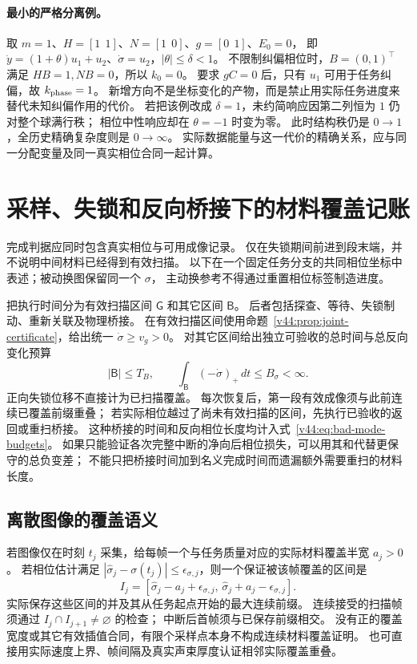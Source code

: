 \documentclass[11pt,a4paper]{article}
\numberwithin{equation}{section}
\theoremstyle{definition}
\begin{document}
\paragraph{最小的严格分离例。}
取 $m=1$、$H=[1\ \ 1]$、$N=[1\ \ 0]$、$g=[0\ \ 1]$、$E_0=0$，
即 $\dot y=(1+\theta)u_1+u_2$、$\dot\sigma=u_2$，$|\theta|\le\delta<1$。
不限制纠偏相位时，$B=(0,1)^\top$ 满足 $HB=1,NB=0$，所以 $k_0=0$。
要求 $gC=0$ 后，只有 $u_1$ 可用于任务纠偏，故 $k_{\rm phase}=1$。
新增方向不是坐标变化的产物，而是禁止用实际任务进度来替代未知纠偏作用的代价。
若把该例改成 $\delta=1$，未约简响应因第二列恒为 $1$ 仍对整个球满行秩；
相位中性响应却在 $\theta=-1$ 时变为零。
此时结构秩仍是 $0\to1$，全历史精确复杂度则是 $0\to\infty$。
实际数据能量与这一代价的精确关系，应与同一分配变量及同一真实相位合同一起计算。

\section{采样、失锁和反向桥接下的材料覆盖记账}
\label{v44:sec:hybrid-coverage}

完成判据应同时包含真实相位与可用成像记录。
仅在失锁期间前进到段末端，并不说明中间材料已经得到有效扫描。
以下在一个固定任务分支的共同相位坐标中表述；被动换图保留同一个 $\sigma$，
主动换参考不得通过重置相位标签制造进度。

把执行时间分为有效扫描区间 $\mathsf G$ 和其它区间 $\mathsf B$。
后者包括探查、等待、失锁制动、重新关联及物理桥接。
在有效扫描区间使用命题~\ref{v44:prop:joint-certificate}，给出统一
$\dot\sigma\ge v_g>0$。
对其它区间给出独立可验收的总时间与总反向变化预算
\begin{equation}
 |\mathsf B|\le T_B,\qquad
 \int_{\mathsf B}(-\dot\sigma)_+\,dt\le B_\sigma<\infty.
 \label{v44:eq:bad-mode-budgets}
\end{equation}
正向失锁位移不直接计为已扫描覆盖。
每次恢复后，第一段有效成像须与此前连续已覆盖前缀重叠；
若实际相位越过了尚未有效扫描的区间，先执行已验收的返回或重扫桥接。
这种桥接的时间和反向相位长度均计入式~\eqref{v44:eq:bad-mode-budgets}。
如果只能验证各次完整中断的净向后相位损失，可以用其和代替更保守的总负变差；
不能只把桥接时间加到名义完成时间而遗漏额外需要重扫的材料长度。

\subsection{离散图像的覆盖语义}
若图像仅在时刻 $t_j$ 采集，给每帧一个与任务质量对应的实际材料覆盖半宽 $a_j>0$。
若相位估计满足 $|\widehat\sigma_j-\sigma(t_j)|\le\epsilon_{\sigma,j}$，则一个保证被该帧覆盖的区间是
\begin{equation}
 I_j=[\widehat\sigma_j-a_j+\epsilon_{\sigma,j},\,
       \widehat\sigma_j+a_j-\epsilon_{\sigma,j}].
 \label{v44:eq:certified-frame-interval}
\end{equation}
实际保存这些区间的并及其从任务起点开始的最大连续前缀。
连续接受的扫描帧须通过 $I_j\cap I_{j+1}\ne\varnothing$ 的检查；
中断后首帧须与已保存前缀相交。
没有正的覆盖宽度或其它有效插值合同，有限个采样点本身不构成连续材料覆盖证明。
也可直接用实际速度上界、帧间隔及真实声束厚度认证相邻实际覆盖重叠。
\end{document}
